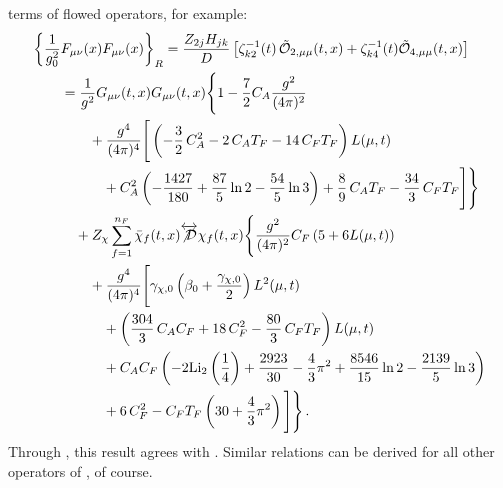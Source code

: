 terms of flowed operators, for example:
\begin{equation}
  \begin{split}
    \bigg\{\frac{1}{g_0^2}&F_{\mu\nu}(x)F_{\mu\nu}(x)\bigg\}_R =
    \frac{Z_{2j}H_{jk}}{D}\left[\zeta_{k2}^{-1}(t)\,\tcalo_{2,\mu\mu}(t,x) +
      \zeta_{k4}^{-1}(t)\tcalo_{4,\mu\mu}(t,x)\right]\\
    &=\frac{1}{g^2} G_{\mu\nu}(t,x)G_{\mu\nu}(t,x) \Bigg\{ 1 -
         \frac{7}{2} C_A \gcoup{2} \\
      & \qquad + \gcoup{4}\Bigg[ \left( - \frac{3}{2}\, C_A^2 - 2\, C_A T_F - 14\, C_F T_F \right) L(\mu, t) \\
      & \qquad \quad + C_A^2 \left( - \frac{1427}{180} + \frac{87}{5} \ln 2 - \frac{54}{5} \ln 3 \right) + \frac{8}{9}\, C_A T_F - \frac{34}{3}\, C_F T_F \Bigg] \Bigg\} \\
    & \quad+ Z_\chi \sum_{f=1}^{n_F}\bar\chi_f(t,x) \overleftrightarrow{\slashed{\mathcal{D}}}\chi_{f}(t,x) \Bigg\{ \gcoup{2}C_F\left(5 + 6 L (\mu, t)\right) \\
    & \qquad + \gcoup{4} \Bigg[ \gamma_{\chi, 0} \left( \beta_0 + \frac{\gamma_{\chi, 0}}{2} \right) L^2(\mu, t) \\
    & \qquad\quad + \left( \frac{304}{3}\, C_A C_F + 18\, C_F^2 - \frac{80}{3}\, C_F T_F \right) L (\mu, t) \\
    & \qquad \quad+ C_A C_F \left( - 2 \text{Li}_2 \left( \frac{1}{4} \right) + \frac{2923}{30} - \frac{4}{3} \pi^2 + \frac{8546}{15} \ln 2 - \frac{2139}{5} \ln 3 \right) \\
    & \qquad\quad + 6\, C_F^2 - C_F T_F \left( 30 + \frac{4}{3} \pi^2 \right) \Bigg]
    \Bigg\}\,.
  \end{split}
\end{equation}
Through \nlo, this result agrees with
.
Similar relations can be derived for all other operators of
, of course.
